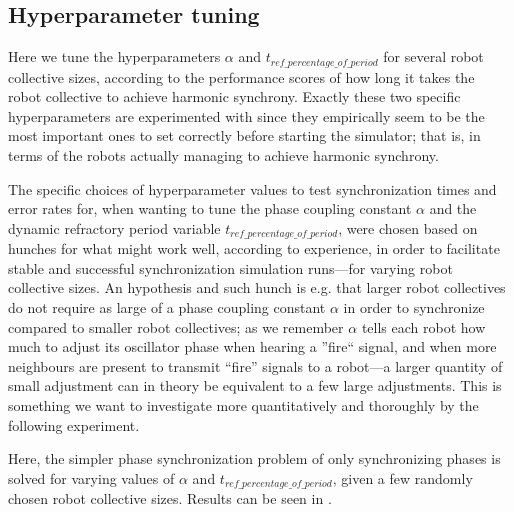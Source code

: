 	
	\subsection{Hyperparameter tuning}
	
	Here we tune the hyperparameters $\alpha$ and $t_{ref\_percentage\_of\_period}$ for several robot collective sizes, according to the performance scores of how long it takes the robot collective to achieve harmonic synchrony. Exactly these two specific hyperparameters are experimented with since they empirically seem to be the most important ones to set correctly before starting the simulator; that is, in terms of the robots actually managing to achieve harmonic synchrony.
	
	The specific choices of hyperparameter values to test synchronization times and error rates for, when wanting to tune the phase coupling constant $\alpha$ and the dynamic refractory period variable $t_{ref\_percentage\_of\_period}$, were chosen based on hunches for what might work well, according to experience, in order to facilitate stable and successful synchronization simulation runs—for varying robot collective sizes. An hypothesis and such hunch is e.g. that larger robot collectives do not require as large of a phase coupling constant $\alpha$ in order to synchronize compared to smaller robot collectives; as we remember $\alpha$ tells each robot how much to adjust its oscillator phase when hearing a ''fire`` signal, and when more neighbours are present to transmit ``fire'' signals to a robot—a larger quantity of small adjustment can in theory be equivalent to a few large adjustments. This is something we want to investigate more quantitatively and thoroughly by the following experiment.
	
	Here, the simpler phase synchronization problem of only synchronizing phases is solved for varying values of $\alpha$ and $t_{ref\_percentage\_of\_period}$, given a few randomly chosen robot collective sizes. Results can be seen in .
	
	
